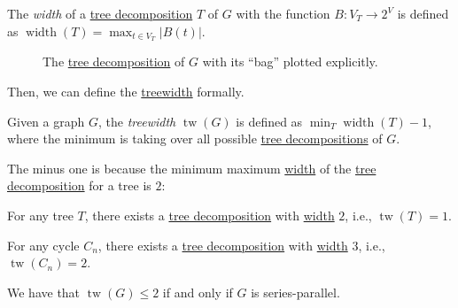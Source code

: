 \begin{definition}[Width]\label{def:tree-decomposition-width}
	The \emph{width} of a \hyperref[def:tree-decomposition]{tree decomposition} \(T\) of \(G\) with the function \(B \colon V_T \to 2^V\) is defined as  \(\operatorname{width}(T) = \max _{t \in V_T} \lvert B(t) \rvert \).
\end{definition}

\begin{figure}[H]
	\centering
	\caption{The \hyperref[def:tree-decomposition]{tree decomposition} of \(G\) with its ``bag'' plotted explicitly.}
	\label{fig:tree-decomposition}
\end{figure}

Then, we can define the \hyperref[def:treewidth]{treewidth} formally.

\begin{definition}[Treewidth]\label{def:treewidth}
	Given a graph \(G\), the \emph{treewidth} \(\operatorname{tw}(G) \) is defined as \(\min _{T} \operatorname{width}(T) - 1\), where the minimum is taking over all possible \hyperref[def:tree-decomposition]{tree decompositions} of \(G\).
\end{definition}

The minus one is because the minimum maximum \hyperref[def:tree-decomposition-width]{width} of the \hyperref[def:tree-decomposition]{tree decomposition} for a tree is \(2\):

\begin{eg}[Tree]
	For any tree \(T\), there exists a \hyperref[def:tree-decomposition]{tree decomposition} with \hyperref[def:tree-decomposition-width]{width} \(2\), i.e., \(\operatorname{tw}(T) = 1\).
	\begin{center}
	\end{center}
\end{eg}

\begin{eg}[Cycle]
	For any cycle \(C_n\), there exists a \hyperref[def:tree-decomposition]{tree decomposition} with \hyperref[def:tree-decomposition-width]{width} \(3\), i.e., \(\operatorname{tw}(C_n) = 2\).
	\begin{center}
	\end{center}
\end{eg}

\begin{eg}
	We have that \(\operatorname{tw}(G) \leq 2\) if and only if \(G\) is series-parallel.
\end{eg}

